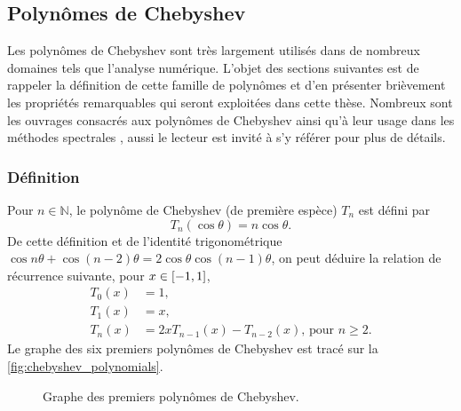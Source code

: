 \subsection{Polynômes de Chebyshev}
Les polynômes de Chebyshev sont très largement utilisés dans de nombreux domaines tels que l'analyse numérique.
L'objet des sections suivantes est de rappeler la définition de cette famille 
de polynômes et d'en présenter brièvement les propriétés remarquables qui seront exploitées dans cette thèse. 
Nombreux sont les ouvrages consacrés aux polynômes de Chebyshev \cite{mason2002, gil2007} ainsi qu'à leur usage dans les méthodes spectrales \cite{boyd2001, canuto2006}, aussi le lecteur est invité à s'y référer pour plus de détails.


\subsubsection{Définition}
Pour $n \in \mathbb{N}$, le polynôme de Chebyshev (de première espèce) $T_n$ est défini par%
\begin{equation}
	T_n(\cos \theta) = n \cos \theta.
	\label{eq:chebyshev_trigo}
\end{equation}
De cette définition et de l'identité trigonométrique $\cos n\theta + \cos (n-2)\theta = 2\cos \theta \cos (n-1)\theta$, on peut déduire la relation de récurrence suivante, pour $x \in \left[ -1, 1 \right]$, 
\begin{align}
	T_0(x) &= 1, \nonumber\\
	T_1(x) &= x, \nonumber\\
	T_n(x) &= 2x T_{n-1}(x) - T_{n-2}(x) \text{,\ pour\ } n \geq 2.
	\label{eq:chebyshev_recurrence}
\end{align}
Le graphe des six premiers polynômes de Chebyshev est tracé sur la \autoref{fig:chebyshev_polynomials}.\par

\begin{figure}
	\centering
	
	\caption{Graphe des premiers polynômes de Chebyshev.}%
	\label{fig:chebyshev_polynomials}
\end{figure}

